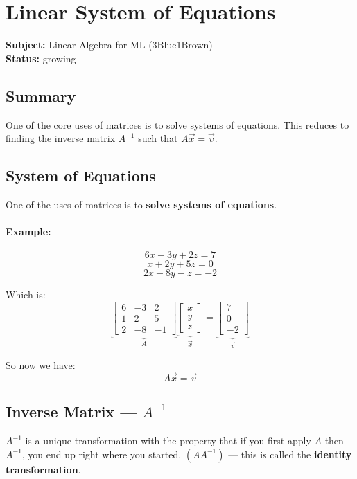 \section{Linear System of Equations}
\label{sec:linear-systems}

\noindent\textbf{Subject:} Linear Algebra for ML (3Blue1Brown) \\
\textbf{Status:} growing

\subsection*{Summary}
One of the core uses of matrices is to solve systems of equations. This reduces to finding the inverse matrix $A^{-1}$ such that $A\vec{x} = \vec{v}$.

\subsection{System of Equations}

One of the uses of matrices is to \textbf{solve systems of equations}.

\paragraph{Example:}
\[
6x - 3y + 2z = 7
\]
\[
x + 2y + 5z = 0
\]
\[
2x - 8y - z = -2
\]

Which is:
\[
\underbrace{\begin{bmatrix} 6 & -3 & 2 \\ 1 & 2 & 5 \\ 2 & -8 & -1 \end{bmatrix}}_{A}
\underbrace{\begin{bmatrix} x \\ y \\ z \end{bmatrix}}_{\vec{x}}
=
\underbrace{\begin{bmatrix} 7 \\ 0 \\ -2 \end{bmatrix}}_{\vec{v}}
\]

So now we have:
\[
A\vec{x} = \vec{v}
\]

\subsection{Inverse Matrix --- $A^{-1}$}

\begin{defbox}
$A^{-1}$ is a unique transformation with the property that if you first apply $A$ then $A^{-1}$, you end up right where you started. $(A A^{-1})$ --- this is called the \textbf{identity transformation}.
\end{defbox}

